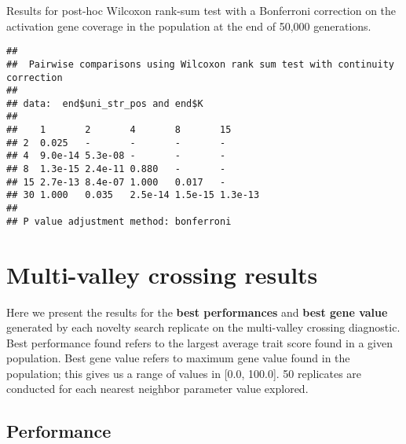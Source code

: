 \documentclass[]{book}
\newenvironment{Shaded}{\begin{snugshade}}{\end{snugshade}}
\newcommand{\DataTypeTok}[1]{\textcolor[rgb]{0.13,0.29,0.53}{#1}}
\newcommand{\KeywordTok}[1]{\textcolor[rgb]{0.13,0.29,0.53}{\textbf{#1}}}
\newcommand{\NormalTok}[1]{#1}
\newcommand{\OperatorTok}[1]{\textcolor[rgb]{0.81,0.36,0.00}{\textbf{#1}}}
\newcommand{\OtherTok}[1]{\textcolor[rgb]{0.56,0.35,0.01}{#1}}
\newcommand{\StringTok}[1]{\textcolor[rgb]{0.31,0.60,0.02}{#1}}
\begin{document}
Results for post-hoc Wilcoxon rank-sum test with a Bonferroni correction on the activation gene coverage in the population at the end of 50,000 generations.

\begin{Shaded}
\end{Shaded}

\begin{verbatim}
## 
##  Pairwise comparisons using Wilcoxon rank sum test with continuity correction 
## 
## data:  end$uni_str_pos and end$K 
## 
##    1       2       4       8       15     
## 2  0.025   -       -       -       -      
## 4  9.0e-14 5.3e-08 -       -       -      
## 8  1.3e-15 2.4e-11 0.880   -       -      
## 15 2.7e-13 8.4e-07 1.000   0.017   -      
## 30 1.000   0.035   2.5e-14 1.5e-15 1.3e-13
## 
## P value adjustment method: bonferroni
\end{verbatim}

\hypertarget{multi-valley-crossing-results-6}{%
\section{Multi-valley crossing results}\label{multi-valley-crossing-results-6}}

Here we present the results for the \textbf{best performances} and \textbf{best gene value} generated by each novelty search replicate on the multi-valley crossing diagnostic.
Best performance found refers to the largest average trait score found in a given population.
Best gene value refers to maximum gene value found in the population; this gives us a range of values in {[}0.0, 100.0{]}.
50 replicates are conducted for each nearest neighbor parameter value explored.

\hypertarget{performance-13}{%
\subsection{Performance}\label{performance-13}}
\end{document}
